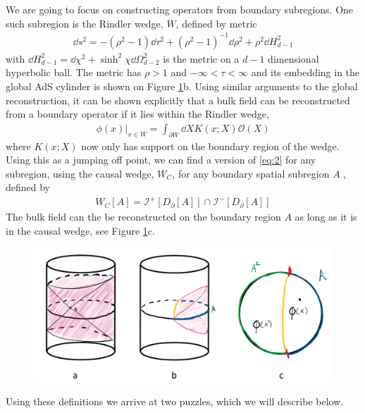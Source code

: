 \documentclass[letter,12pt]{article}
\newcommand{\BO}{\mathcal{O}}
\begin{document}
We are going to focus on constructing operators from boundary subregions. One such subregion is the Rindler wedge, $W$, defined by metric
\begin{equation}
	\begin{aligned}
		\dd s^2=-(\rho^2-1)\dd \tau^2+(\rho^2-1)^{-1}\dd \rho^2+\rho^2\dd H_{d-1}^2
	\end{aligned}
\end{equation}
with $\dd H^2_{d-1}=\dd \chi^2+\sinh^2\chi\dd \Omega_{d-2}^2$ is the metric on a $d-1$ dimensional hyperbolic ball. The metric has $\rho>1$ and $-\infty <\tau < \infty$ and its embedding in the global AdS cylinder is shown on Figure \ref{fig:adscftfig2}b. Using similar arguments to the global reconstruction, it can be shown explicitly that a bulk field can be reconstructed from a boundary operator if it lies within the Rindler wedge,
\begin{equation}
	\begin{aligned}
		\phi(x)|_{x\in W}=\int_{\partial W}\dd X K(x;X)\BO(X)
	\end{aligned}
\end{equation}
where $K(x;X)$ now only has support on the boundary region of the wedge. Using this as a jumping off point, we can find a version of \eqref{eq:2} for any subregion, using the causal wedge, $W_C$, for any boundary spatial subregion $A$ , defined by 
\begin{equation}
	\begin{aligned}
		W_C[A]=\mathscr{I}^+[D_\partial[A]]\cap\mathscr{I}^-[D_\partial[A]]
	\end{aligned}
\end{equation}
The bulk field can the be reconstructed on the boundary region $A$ as long as it is in the causal wedge, see Figure \ref{fig:adscftfig2}c. 
\begin{figure}[]
	\centering
	\includegraphics[width=0.95\linewidth]{ADS_CFT_Fig2}
	\caption{}
	\label{fig:adscftfig2}
\end{figure}
Using these definitions we arrive at two puzzles, which we will describe below.
\end{document}

